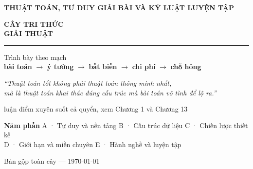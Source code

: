 \documentclass[11pt,a4paper,oneside]{report}
\begin{document}
\hypersetup{pageanchor=false}
\begin{titlepage}
\thispagestyle{empty}

\vspace*{4.2cm}
\begin{flushleft}
{\sffamily\bfseries\color{accent}\large THUẬT TOÁN, TƯ DUY GIẢI BÀI VÀ KỶ LUẬT LUYỆN TẬP\par}
\vspace{0.5cm}
{\sffamily\bfseries\color{inkblue}\fontsize{40}{45}\selectfont
CÂY TRI THỨC\\[0.12em] GIẢI THUẬT\par}
\vspace{0.9cm}
{\color{accent}\rule{7cm}{2.4pt}}\par
\vspace{0.9cm}
{\large\color{inkblue!85}
Trình bày theo mạch\\[0.25em]
\textbf{bài toán} \(\rightarrow\) \textbf{ý tưởng} \(\rightarrow\) \textbf{bất biến} \(\rightarrow\) \textbf{chi phí} \(\rightarrow\) \textbf{chỗ hỏng}\par}
\end{flushleft}

\vfill
\begin{flushleft}
{\itshape\color{tiercol}``Thuật toán tốt không phải thuật toán thông minh nhất,\\
mà là thuật toán khai thác đúng cấu trúc mà bài toán vô tình để lộ ra.''\par}
{\footnotesize\sffamily\color{tiercol}luận điểm xuyên suốt cả quyển, xem Chương 1 và Chương 13\par}
\vspace{1.1cm}
{\footnotesize\sffamily\color{inkblue}\textbf{Năm phần}\quad
A · Tư duy và nền tảng \quad B · Cấu trúc dữ liệu \quad C · Chiến lược thiết kế\\[0.25em]
\quad D · Giới hạn và miền chuyên \quad E · Hành nghề và luyện tập\par}
\vspace{0.5em}
{\footnotesize\sffamily\color{tiercol}Bản gộp toàn cây --- \today\par}
\end{flushleft}
\end{titlepage}
\end{document}
